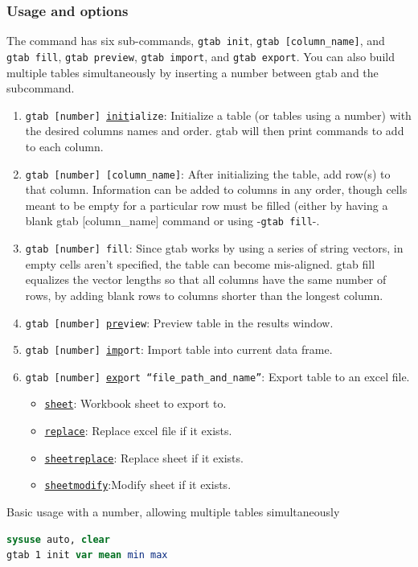 \documentclass[11pt]{article}
\begin{document}
{\subsubsection{Usage and options}
The command has six sub-commands, \texttt{gtab init}, \texttt{gtab [column\_name]}, and \texttt{gtab fill}, \texttt{gtab preview}, \texttt{gtab import}, and \texttt{gtab export}. You can also build multiple tables simultaneously by inserting a number between gtab and the subcommand.
\begin{enumerate}
\item \texttt{gtab [number] \underline{init}ialize}: Initialize a table (or tables using a number) with the desired columns names and order. gtab will then print commands to add to each column.
\item \texttt{gtab [number] [column\_name]}: After initializing the table, add row(s) to that column. Information can be added to columns in any order, though cells meant to be empty for a particular row must be filled (either by having a blank gtab [column\_name] command or using -\texttt{gtab fill}-.
\item \texttt{gtab [number] fill}: Since gtab works by using a series of string vectors, in empty cells aren't specified, the table can become mis-aligned. gtab fill equalizes the vector lengths so that all columns have the same number of rows, by adding blank rows to columns shorter than the longest column.
\item \texttt{gtab [number] \underline{pre}view}: Preview table in the results window.
\item \texttt{gtab [number] \underline{imp}ort}: Import table into current data frame.
\item \texttt{gtab [number] \underline{exp}ort ``file\_path\_and\_name''}: Export table to an excel file.
\begin{itemize}
\item \texttt{\underline{sheet}}: Workbook sheet to export to.
\item \texttt{\underline{replace}}: Replace excel file if it exists.
\item \texttt{\underline{sheetreplace}}: Replace sheet if it exists.
\item \texttt{\underline{sheetmodify}}:Modify sheet if it exists.
\end{itemize}

\end{enumerate}

Basic usage with a number, allowing multiple tables simultaneously
\begin{lstlisting}[language=Stata, numbers=none]
sysuse auto, clear
gtab 1 init var mean min max


\end{lstlisting}}
\end{document}
